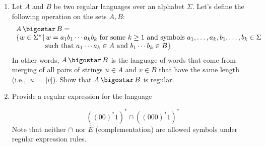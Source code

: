 \documentclass[ x11names, dvipsnames, usenames]{article}
\begin{document}
\begin{enumerate}
\begin{comment}
\end{comment}
 
 \item  Let $A$ and $B$ be two regular languages over an alphabet $\Sigma$. Let’s define the following operation on the sets $A, B$:
 \[ \begin{array}{l}
 A  \, \bigostar \, B = \\
  \{ w \in \Sigma^* \, | \, w = a_1 b_1 \cdots a_k b_k \text{ for some $k \ge 1$ and symbols $a_1, \ldots, a_k, b_1, \ldots, b_k \in \Sigma$}\\
  \hspace{1.35cm}\text{ such that $a_1\cdots a_k \in A$ and $b_1\cdots b_k \in B$} \}
  \end{array} \]     
 In other words, $A\,\bigostar \, B$ is the language of words that come from merging of all pairs of strings $u \in A$ and $v \in B$ that have the same length (i.e., $|u| = |v|$). Show that $A \, \bigostar \, B$ is regular.
     
\begin{comment}

\vspace{2mm}\hrule\vspace{2mm}
 \textbf{Solution.}  \\[0.5mm]





 
\vspace{2mm}\hrule\vspace{2mm}
    
 \end{comment}
 
 
 


\item Provide a regular expression for the language

\[ ((00)^*1)^* \cap ((000)^*1)^* \]
Note that neither $\cap$ nor $\overline{E}$ (complementation) are allowed symbols under regular expression rules.
 
 
 
 
 
 
 
  

\begin{comment}
\vspace{2mm}\hrule\vspace{2mm}
\textbf{Solution.} \\[0.5mm]






\end{comment}
\end{enumerate}
\end{document}
